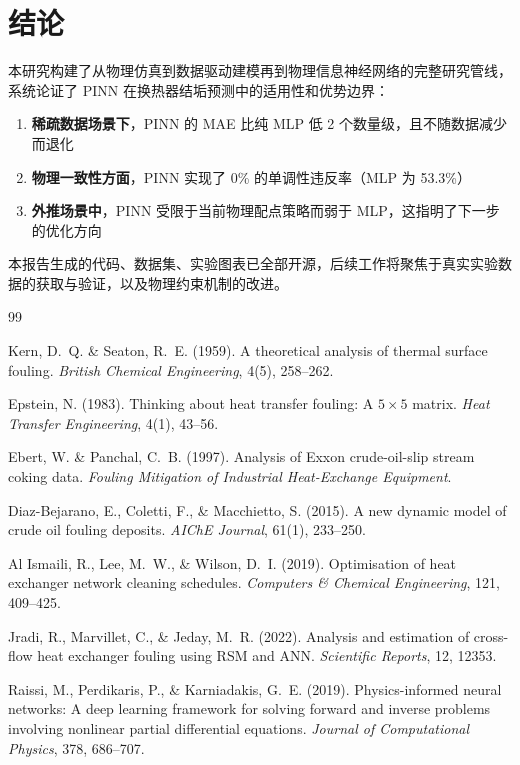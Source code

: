 \documentclass[12pt,a4paper]{ctexart}
\begin{document}
\section{结论}

本研究构建了从物理仿真到数据驱动建模再到物理信息神经网络的完整研究管线，系统论证了 PINN 在换热器结垢预测中的适用性和优势边界：

\begin{enumerate}[label=\arabic*.]
    \item \textbf{稀疏数据场景下}，PINN 的 MAE 比纯 MLP 低 2 个数量级，且不随数据减少而退化
    \item \textbf{物理一致性方面}，PINN 实现了 0\% 的单调性违反率（MLP 为 53.3\%）
    \item \textbf{外推场景中}，PINN 受限于当前物理配点策略而弱于 MLP，这指明了下一步的优化方向
\end{enumerate}

本报告生成的代码、数据集、实验图表已全部开源，后续工作将聚焦于真实实验数据的获取与验证，以及物理约束机制的改进。

\begin{thebibliography}{99}

Kern, D.~Q. \& Seaton, R.~E. (1959).
A theoretical analysis of thermal surface fouling.
\textit{British Chemical Engineering}, 4(5), 258--262.

Epstein, N. (1983).
Thinking about heat transfer fouling: A $5\times5$ matrix.
\textit{Heat Transfer Engineering}, 4(1), 43--56.

Ebert, W. \& Panchal, C.~B. (1997).
Analysis of Exxon crude-oil-slip stream coking data.
\textit{Fouling Mitigation of Industrial Heat-Exchange Equipment}.

Diaz-Bejarano, E., Coletti, F., \& Macchietto, S. (2015).
A new dynamic model of crude oil fouling deposits.
\textit{AIChE Journal}, 61(1), 233--250.

Al Ismaili, R., Lee, M.~W., \& Wilson, D.~I. (2019).
Optimisation of heat exchanger network cleaning schedules.
\textit{Computers \& Chemical Engineering}, 121, 409--425.

Jradi, R., Marvillet, C., \& Jeday, M.~R. (2022).
Analysis and estimation of cross-flow heat exchanger fouling using RSM and ANN.
\textit{Scientific Reports}, 12, 12353.

Raissi, M., Perdikaris, P., \& Karniadakis, G.~E. (2019).
Physics-informed neural networks: A deep learning framework for solving forward and inverse problems involving nonlinear partial differential equations.
\textit{Journal of Computational Physics}, 378, 686--707.

\end{thebibliography}
\end{document}
